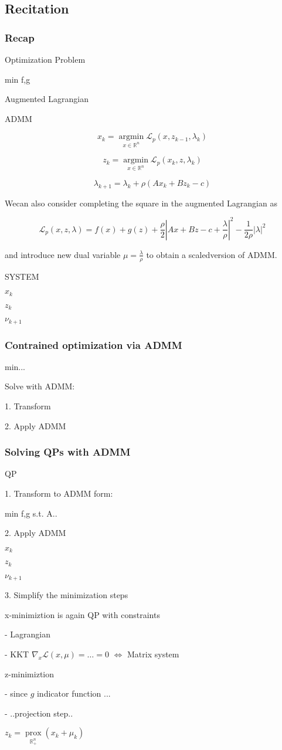 \subsection{Recitation}

\subsubsection{Recap}
Optimization Problem

min f,g

Augmented Lagrangian

ADMM

$$x_k=\underset{x \in \mathbb{R}^{n} }{\operatorname{argmin}}\mathcal{L}_p(x,z_{k-1},\lambda_k) $$

$$z_k=\underset{x \in \mathbb{R}^{n} }{\operatorname{argmin}}\mathcal{L}_p(x_k,z,\lambda_k) $$

$$ \lambda_{k+1}=\lambda_k+\rho(Ax_k+Bz_k-c)$$

Wecan also consider completing the square in the augmented Lagrangian as

$$\mathcal{L}_p(x,z,\lambda) =
	f(x)+g(z)+\frac{\rho}{2}|Ax+Bz-c+\frac{\lambda}{\rho}|^2-\frac{1}{2\rho}|\lambda|^2 $$

and introduce new dual variable
$\mu=\frac{\lambda}{\rho}$
to obtain a scaledversion of ADMM.

SYSTEM

$x_k$

$z_k$

$\nu_{k+1}$

\subsubsection{Contrained optimization via ADMM}

min...

Solve with ADMM:

1. Transform

2. Apply ADMM

\subsubsection{Solving  QPs with ADMM}

QP

1. Transform to ADMM form:

min f,g s.t. A..

2. Apply ADMM

$x_k$

$z_k$

$\nu_{k+1}$

3. Simplify the minimization steps

x-minimiztion is again  QP with constraints

- Lagrangian

- KKT $\nabla_x\mathcal{L}(x,\mu)=\dots=0$
$\Leftrightarrow$ Matrix system

z-minimiztion

- since $g$ indicator function ...

- ..projection step..

$z_k=\underset{\mathbb{R}_+^{n}}{\operatorname{prox}}(x_k+\mu_k)$
